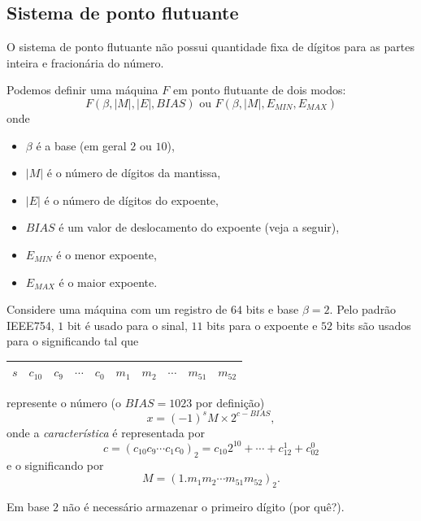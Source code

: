 \subsection{Sistema de ponto flutuante}

O sistema de ponto flutuante não possui quantidade fixa de dígitos para as partes inteira e fracionária do número.

Podemos definir uma máquina $F$ em ponto flutuante de dois modos:
\begin{equation}  F(\beta,|M|,|E|,BIAS) \text{ ou } F(\beta,|M|,E_{MIN},E_{MAX}) \end{equation}
onde
\begin{itemize}
 \item $\beta$ é a base (em geral $2$ ou $10$),
 \item $|M|$ é o número de dígitos da mantissa,
 \item $|E|$ é o número de dígitos do expoente,
 \item $BIAS$ é um valor de deslocamento do expoente (veja a seguir),
 \item $E_{MIN}$ é o menor expoente,
 \item $E_{MAX}$ é o maior expoente.
\end{itemize}


Considere uma máquina com um registro de $64$ bits e base $\beta=2$. Pelo padrão IEEE754, $1$ bit é usado para o sinal, $11$ bits para o expoente e $52$ bits são usados para o significando tal que
\begin{center}
  \begin{tabular}{|c|c|c|c|c|c|c|c|c|c|}\hline
    $s$ & $c_{10}$ & $c_{9}$ & $\cdots$ & $c_{0}$ & $m_1$ & $m_2$ & $\cdots$ & $m_{51}$ & $m_{52}$\\\hline
  \end{tabular}
\end{center}
represente o número (o $BIAS=1023$ por definição)
\begin{equation}  x=(-1)^{s}M \times 2^{c-BIAS}, \end{equation}
onde a \emph{característica} é representada por
\begin{equation} c=(c_{10}c_9\cdots c_1c_0)_2=c_{10}2^{10}+\cdots+c_12^1+c_02^0  \end{equation}
e o significando por
\begin{equation} M=(1.m_1m_2\cdots m_{51}m_{52})_2. \end{equation}

\begin{obs}
  Em base $2$ não é necessário armazenar o primeiro dígito (por quê?).
\end{obs}

